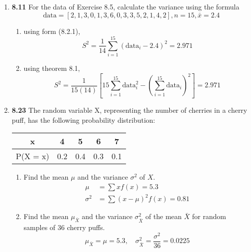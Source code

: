 \documentclass[basic, header]{nosvagor-notes}
\begin{document}
\begin{enumerate}[itemsep=2em]
\begin{enumerate}
    \end{enumerate}

  \item \textbf{8.11} For the data of Exercise 8.5, calculate the variance using the formula
    \[%
      \text{data} = [2, 1, 3, 0, 1, 3, 6, 0, 3, 3, 5, 2, 1, 4, 2], n = 15, \bar{x} = 2.4
    \]%
    \begin{enumerate}

      \item using form (8.2.1),
        \[%
          S^2 = \frac{1}{14} \sum_{i=1}^{15} \left( \text{data}_i - 2.4 \right)^2 = \boxed{2.971}
        \]%

      \item using theorem 8.1,
        \[%
          S^2 = \frac{1}{15(14)} \left[ 15 \sum_{i=1}^{15} \text{data}_i^2 - \left( \sum_{i=1}^{15} \text{data}_i \right)^2  \right] = \boxed{2.971}
        \]%

    \end{enumerate}

  \newpage %

  \item \textbf{8.23} The random variable X, representing the number of cherries in a
    cherry puff, has the following probability distribution:
    \begin{table}[h]
      \centering
      \begin{tabular}{c|cccc}
        x & 4 & 5 & 6 & 7 \\
        \midrule
        P(X = x) & 0.2 & 0.4 & 0.3 & 0.1 \\
      \end{tabular}
    \end{table}
    \begin{enumerate}

      \item Find the mean \(\mu\) and the variance \(\sigma^2\) of \(X\).
          \begin{align*}
            \mu &= \sum xf(x) = \boxed{5.3} \\
            \sigma^2 &= \sum(x - \mu)^2f(x) = \boxed{0.81}
          \end{align*}
      \item Find the mean \(\mu_{\bar{X}} \) and the variance
        \(\sigma^2_{\bar{X}} \) of the mean \(\bar{X}\) for random samples of
        36 cherry puffs.
        \[%
          \mu_{\bar{X}} = \mu = \boxed{5.3}, \quad \sigma^2_{\bar{X}} = \frac{\sigma^2}{36} = \boxed{0.0225}
        \]%


\end{enumerate}
\end{enumerate}
\end{document}
